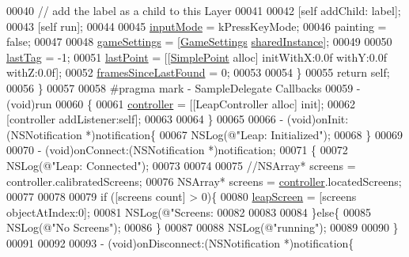 \begin{DoxyCode}
{00040             \textcolor{comment}{// add the label as a child to this Layer}
00041         
00042         [\textcolor{keyword}{self} addChild: label];
00043         [\textcolor{keyword}{self} run];
00044         
00045         \hyperlink{interface_game_manager_a43f8cf09eea5b0766c73b0d2b258644c}{inputMode} = kPressKeyMode;
00046         painting = \textcolor{keyword}{false};
00047         
00048         \hyperlink{interface_game_manager_a97ff3b8cd0cbc6baf6f5abe3bb3417ca}{gameSettings} = [\hyperlink{interface_game_settings}{GameSettings} \hyperlink{interface_game_settings_abdcc2e77ea14381a85c6de67c83df624}{sharedInstance}];
00049         
00050         \hyperlink{interface_game_manager_a0b83b09829718f85c17d64f6ee06d441}{lastTag} = -1;
00051         \hyperlink{interface_game_manager_a4f2a6986ffdbc41d661e90deaee4551a}{lastPoint} = [[\hyperlink{interface_simple_point}{SimplePoint} alloc] initWithX:0.0f withY:0.0f withZ:0.0f];
00052         \hyperlink{interface_game_manager_a546c4660d830a79c27bc2a51da00df12}{framesSinceLastFound} = 0;
00053          
00054     \}
00055     \textcolor{keywordflow}{return} \textcolor{keyword}{self};
00056 \}
00057 
00058 \textcolor{preprocessor}{#pragma mark - SampleDelegate Callbacks}
00059 \textcolor{preprocessor}{}- (void)run
00060 \{
00061     \hyperlink{interface_game_manager_a4b089253ae3569099d28535b128f3436}{controller} = [[LeapController alloc] init];
00062     [controller addListener:self];
00063     
00064 \}
00065 
00066 - (void)onInit:(NSNotification *)notification\{
00067     NSLog(\textcolor{stringliteral}{@"Leap: Initialized"});
00068 \}
00069 
00070 - (void)onConnect:(NSNotification *)notification;
00071 \{
00072     NSLog(\textcolor{stringliteral}{@"Leap: Connected"});
00073 
00074     
00075     \textcolor{comment}{//NSArray* screens = controller.calibratedScreens;}
00076     NSArray* screens = \hyperlink{interface_game_manager_a4b089253ae3569099d28535b128f3436}{controller}.locatedScreens;
00077     
00078     
00079     \textcolor{keywordflow}{if} ([screens count] > 0)\{
00080         \hyperlink{interface_game_manager_a85cb30e21c987f66855a762c6ba88096}{leapScreen} = [screens objectAtIndex:0];
00081         NSLog(\textcolor{stringliteral}{@"Screens: %
00082         
00083         
00084     \}\textcolor{keywordflow}{else}\{
00085         NSLog(\textcolor{stringliteral}{@"No Screens"});
00086     \}
00087     
00088     NSLog(\textcolor{stringliteral}{@"running"});
00089 
00090 \}
00091 
00092 
00093 - (void)onDisconnect:(NSNotification *)notification\{
}}
\end{DoxyCode}
